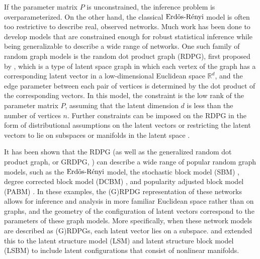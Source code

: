 \documentclass[12pt]{article}
\begin{document}
If the parameter matrix \(P\) is unconstrained, the inference problem is
overparameterized. On the other hand, the classical \(\text{Erd\"{o}s-R\'{e}nyi}\) model is
often too restrictive to describe real, observed networks. Much work has
been done to develop models that are constrained enough for robust
statistical inference while being generalizable to describe a wide range
of networks. One such family of random graph models is the random dot
product graph (RDPG), first proposed by
\citet{10.1007/978-3-540-77004-6_11}, which is a type of latent space
graph in which each vertex of the graph has a corresponding latent
vector in a low-dimensional Euclidean space \(\mathbb{R}^d\), and the
edge parameter between each pair of vertices is determined by the dot
product of the corresponding vectors. In this model, the constraint is
the low rank of the parameter matrix \(P\), assuming that the latent
dimension \(d\) is less than the number of vertices \(n\). Further
constraints can be imposed on the RDPG in the form of distributional
assumptions on the latent vectors or restricting the latent vectors to
lie on subspaces or manifolds in the latent space
\citep{athreya2020estimation}.

It has been shown \citep{Koo_2022, rubindelanchy2017statistical} that
the RDPG (as well as the generalized random dot product graph, or GRDPG,
\citep{rubindelanchy2017statistical}) can describe a wide range of
popular random graph models, such as the \(\text{Erd\"{o}s-R\'{e}nyi}\) model, the stochastic
block model (SBM) \citep{doi:10.1080/0022250X.1971.9989788}, degree
corrected block model (DCBM) \citep{Karrer_2011}, and popularity
adjusted block model (PABM) \citep{307cbeb9b1be48299388437423d94bf1}. In
these examples, the (G)RPDG representation of these networks allows for
inference and analysis in more familiar Euclidean space rather than on
graphs, and the geometry of the configuration of latent vectors
correspond to the parameters of these graph models. More specifically,
when these network models are described as (G)RDPGs, each latent vector
lies on a subspace. \citet{athreya2020estimation} and
\citet{Passino_2020} extended this to the latent structure model (LSM)
and latent structure block model (LSBM) to include latent configurations
that consist of nonlinear manifolds.
\end{document}
